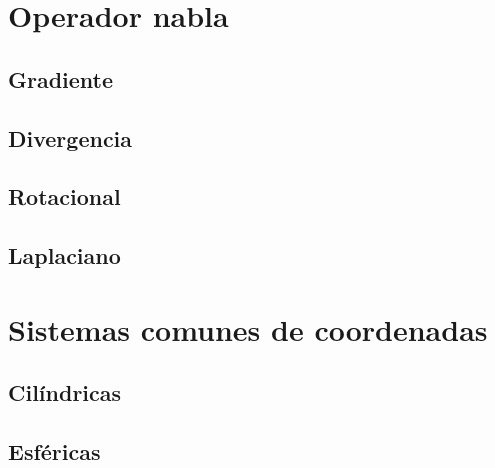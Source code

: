 \documentclass[12pt, fleqn]{report}                             %
\begin{document}
        \section{Operador nabla}
        
            \subsection{Gradiente}
            
            \subsection{Divergencia}
            
            \subsection{Rotacional}
            
            \subsection{Laplaciano}
            
        \section{Sistemas comunes de coordenadas}
        
            \subsection{Cilíndricas}
            
            \subsection{Esféricas}
            
\end{document}
